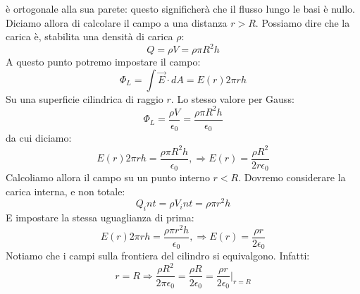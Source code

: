 \documentclass[a4paper,12pt]{article}
\begin{document}
\begin{itemize}
  è ortogonale alla sua parete: questo significherà che il flusso lungo le basi è nullo. Diciamo allora di calcolare il campo a una distanza $r>R$. Possiamo dire che la carica è, stabilita una densità di carica $\rho$:
  $$ Q = \rho V = \rho \pi R^2 h$$
  A questo punto potremo impostare il campo:
  $$ \Phi_L = \int \vec{E} \cdot dA = E(r) 2\pi r h $$
  Su una superficie cilindrica di raggio $r$. Lo stesso valore per Gauss:
  $$ \Phi_L = \frac{\rho V}{\epsilon_0} = \frac{\rho \pi R^2 h}{\epsilon_0} $$
  da cui diciamo:
  $$ E(r)2\pi r h = \frac{\rho \pi R^2 h}{\epsilon_0}, \Rightarrow E(r) = \frac{\rho R^2}{2r\epsilon_0} $$
  Calcoliamo allora il campo su un punto interno $r < R$. Dovremo considerare la carica interna, e non totale:
  $$ Q_int = \rho V_int = \rho \pi r^2 h$$
  E impostare la stessa uguaglianza di prima:
  $$ E(r)2\pi r h = \frac{\rho \pi r^2 h}{\epsilon_0}, \Rightarrow E(r) = \frac{\rho r}{2\epsilon_0} $$
  Notiamo che i campi sulla frontiera del cilindro si equivalgono. Infatti:
  $$ r = R \Rightarrow \frac{\rho R^2}{2\pi \epsilon_0} = \frac{\rho R}{2\epsilon_0} = \frac{\rho r}{2\epsilon_0}\Big|_{r=R}$$
\end{itemize}
\end{document}
